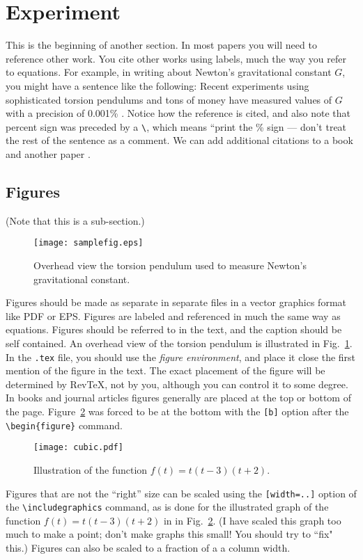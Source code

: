 \documentclass[aps,preprint,groupedaddress,letterpaper]{revtex4-1}
\begin{document}
\section{Experiment}
This is the beginning of another section.  In most papers you will
need to reference other work.  You cite other works using labels, much
the way you refer to equations.  For example, in writing about Newton's 
gravitational constant  
$G$, you might have a sentence like the following: Recent experiments
using sophisticated torsion pendulums and tons of money have measured
values of $G$ with a precision of 0.001\% \cite{Teufel2016}.   Notice how 
the reference is cited, and also note that percent sign was 
preceded by a \verb+\+, which means ``print the \% sign --- don't 
treat the rest of the sentence as a comment.  We can add additional 
citations to a book \cite{SLI90} and another paper \cite{QandJ12}.

\subsection{Figures}
(Note that this is a sub-section.)

\begin{figure}
\texttt{[image: samplefig.eps]}
\caption{Overhead view the torsion pendulum used to measure Newton's 
gravitational constant. 
\label{overhead}}
\end{figure}

Figures should be made as separate in separate files in a 
vector graphics  format like PDF or EPS.
Figures are labeled and referenced in much the same way as 
equations.  Figures should be referred to in the text, and the caption 
should be self contained.  An overhead view of the torsion pendulum 
is illustrated in Fig.~\ref{overhead}.  In the \verb+.tex+ file, you should 
use the \textit{figure environment}, and place it close the first mention 
of the figure in the text.  The exact placement of the figure will be 
determined by RevTeX, not by you, although you can control it to some
degree. In books and journal articles figures generally are placed at the 
top or bottom of the page.  Figure~\ref{cubic_graph} was forced to be 
at the bottom with the \verb+[b]+ option after the \verb+\begin{figure}+ 
command.

\begin{figure}[b]
\texttt{[image: cubic.pdf]}
\caption{Illustration of the function $f(t)=t(t-3)(t+2)$.
\label{cubic_graph}}
\end{figure}
Figures that are not the ``right'' size can be 
scaled using the  \verb+[width=..]+ option of the 
\verb+\includegraphics+ command, 
as is done for the illustrated graph of the function $f(t)=t (t-3)(t+2)$ in
in Fig.~\ref{cubic_graph}.  
(I have scaled this graph too much to make a point; don't make 
graphs this small! You should try to ``fix" this.)
Figures can also be scaled to a fraction of a a column width.
\end{document}
